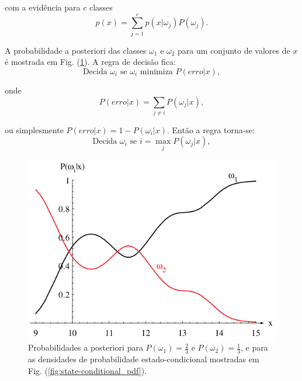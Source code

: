 \documentclass[a4paper,12pt,twocolumn]{article}
\newcommand{\figureref}[1]{Fig. (\ref{fig:#1})}
\begin{document}
\noindent com a evidência para $c$ classes
\begin{equation}
    p(x) = \sum_{j=1}^c p(x|\omega_j)P(\omega_j).
    \label{eq:bayes}
\end{equation}

A probabilidade a posteriori das classes $\omega_1$ e $\omega_2$ para um conjunto de valores de $x$ é mostrada em \figureref{posteriori_prob}. A regra de decisão fica:
\begin{equation}
    \text{Decida } \omega_i \text{ se } \omega_i \text{ minimiza } P(erro|x),
    \label{eq:decision_2}
\end{equation}

\noindent onde
\begin{equation}
    P(erro|x) = \sum_{j\neq i} P(\omega_j|x),
    \label{eq:bayes}
\end{equation}

\noindent ou simplesmente $P(erro|x) = 1 - P(\omega_i|x)$. Então a regra torna-se:
\begin{equation}
    \text{Decida } \omega_i \text{ se } i = \max_j P(\omega_j|x),
    \label{eq:decision_3}
\end{equation}

\begin{figure}[ht]
    \centering
    \includegraphics[scale=0.4]{posteriori_prob}
    \caption{Probabilidades a posteriori para $P(\omega_1) = \frac{2}{3}$ e $P(\omega_2) = \frac{1}{3}$, e para as densidades de probabilidade estado-condicional mostradas em \figureref{state-conditional_pdf}.}
    \label{fig:posteriori_prob}
\end{figure}
\end{document}
